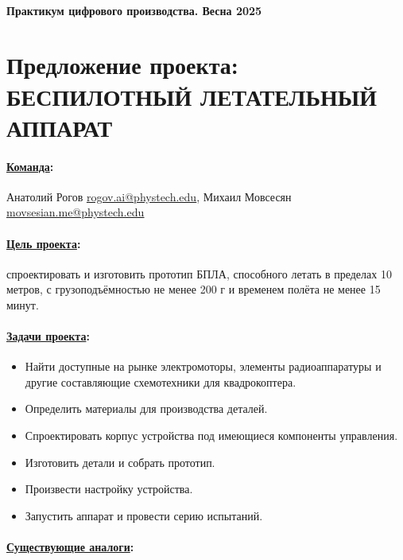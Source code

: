 \documentclass[a4paper,12pt]{article} %
\begin{document}
\paragraph{Практикум цифрового производства. Весна 2025}
\section*{Предложение проекта: \newline БЕСПИЛОТНЫЙ ЛЕТАТЕЛЬНЫЙ АППАРАТ}

\paragraph{\underline{Команда}:}
Анатолий Рогов \href{mailto:rogov.ai@phystech.edu}{\underline{rogov.ai@phystech.edu}}, Михаил Мовсесян \href{mailto:movsesian.me@phystech.edu}{\underline{movsesian.me@phystech.edu}}

\paragraph{\underline{Цель проекта}:}
спроектировать и изготовить прототип БПЛА, способного летать в пределах 10 метров, с грузоподъёмностью не менее 200 г и временем полёта не менее 15 минут.

\paragraph{\underline{Задачи проекта}:}
\begin{itemize}
    \item Найти доступные на рынке электромоторы, элементы радиоаппаратуры и другие составляющие схемотехники для квадрокоптера.
    \item Определить материалы для производства деталей.
    \item Спроектировать корпус устройства под имеющиеся компоненты управления.
    \item Изготовить детали и собрать прототип.
    \item Произвести настройку устройства.
    \item Запустить аппарат и провести серию испытаний.

\end{itemize}

\paragraph{\underline{Существующие аналоги}:}
\end{document}

